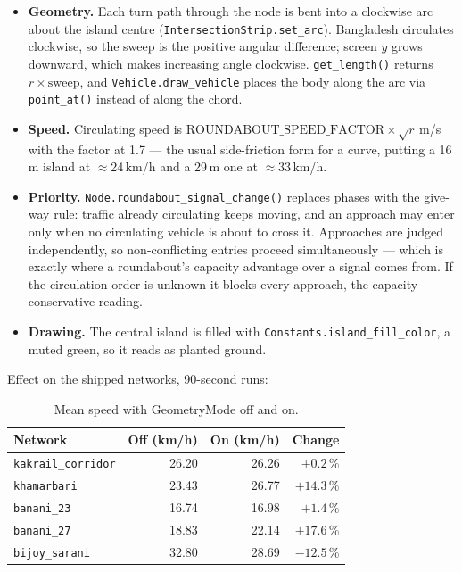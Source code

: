 \documentclass[11pt, a4paper]{article}
\newcommand{\code}[1]{\texttt{#1}}
\begin{document}
\begin{itemize}
    \item \textbf{Geometry.} Each turn path through the node is bent into a
          clockwise arc about the island centre
          (\code{IntersectionStrip.set\_arc}). Bangladesh circulates clockwise,
          so the sweep is the positive angular difference; screen $y$ grows
          downward, which makes increasing angle clockwise.
          \code{get\_length()} returns $r \times \text{sweep}$, and
          \code{Vehicle.draw\_vehicle} places the body along the arc via
          \code{point\_at()} instead of along the chord.
    \item \textbf{Speed.} Circulating speed is
          $\text{ROUNDABOUT\_SPEED\_FACTOR} \times \sqrt{r}$\,m/s with the factor
          at 1.7 --- the usual side-friction form for a curve, putting a 16\,m
          island at $\approx$24\,km/h and a 29\,m one at $\approx$33\,km/h.
    \item \textbf{Priority.} \code{Node.roundabout\_signal\_change()} replaces
          phases with the give-way rule: traffic already circulating keeps
          moving, and an approach may enter only when no circulating vehicle is
          about to cross it. Approaches are judged independently, so
          non-conflicting entries proceed simultaneously --- which is exactly
          where a roundabout's capacity advantage over a signal comes from. If
          the circulation order is unknown it blocks every approach, the
          capacity-conservative reading.
    \item \textbf{Drawing.} The central island is filled with
          \code{Constants.island\_fill\_color}, a muted green, so it reads as
          planted ground.
\end{itemize}

Effect on the shipped networks, 90-second runs:

\begin{table}[h!]
\centering
\begin{tabular}{l r r r}
\toprule
\textbf{Network} & \textbf{Off (km/h)} & \textbf{On (km/h)} & \textbf{Change} \\
\midrule
\code{kakrail\_corridor} & 26.20 & 26.26 & $+0.2$\,\% \\
\code{khamarbari}        & 23.43 & 26.77 & $+14.3$\,\% \\
\code{banani\_23}        & 16.74 & 16.98 & $+1.4$\,\% \\
\code{banani\_27}        & 18.83 & 22.14 & $+17.6$\,\% \\
\code{bijoy\_sarani}     & 32.80 & 28.69 & $-12.5$\,\% \\
\bottomrule
\end{tabular}
\caption{Mean speed with GeometryMode off and on.}
\end{table}
\end{document}

